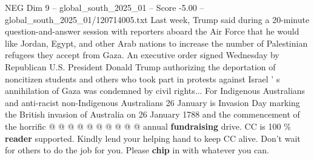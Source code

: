 \begin{textsample}{NEG Dim 9 – global\_south\_2025\_01 – Score -5.00 – global\_south\_2025\_01/120714005.txt}
Last week, Trump said during a 20-minute question-and-answer session with reporters aboard the Air Force that he would like Jordan, Egypt, and other Arab nations to increase the number of Palestinian refugees they accept from Gaza.
An executive order signed Wednesday by Republican U.S.
President Donald Trump authorizing the deportation of noncitizen students and others who took part in protests against Israel ' s annihilation of Gaza was condemned by civil rights...
For Indigenous Australians and anti-racist non-Indigenous Australians 26 January is Invasion Day marking the British invasion of Australia on 26 January 1788 and the commencement of the horrific @ @ @ @ @ @ @ @ @ @ annual \textbf{fundraising} drive.
CC is 100 \% \textbf{reader} supported.
Kindly lend your helping hand to keep CC alive.
Don't wait for others to do the job for you.
Please \textbf{chip} in with whatever you can.

\end{textsample}
